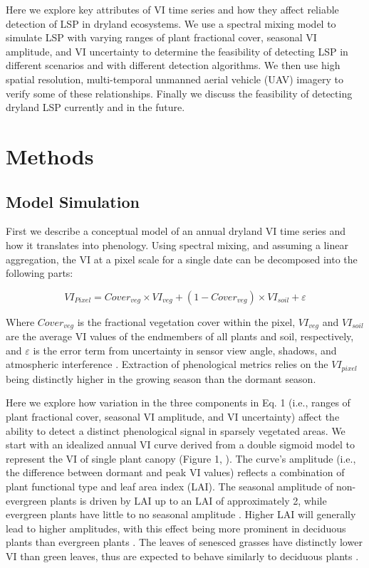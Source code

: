 \documentclass{article}
\begin{document}
Here we explore key attributes of VI time series and how they affect reliable detection of LSP in dryland ecosystems. We use a spectral mixing model to simulate LSP with varying ranges of plant fractional cover, seasonal VI amplitude, and VI uncertainty to determine the feasibility of detecting LSP in different scenarios and with different detection algorithms. We then use high spatial resolution, multi-temporal unmanned aerial vehicle (UAV) imagery to verify some of these relationships. Finally we discuss the feasibility of detecting dryland LSP currently and in the future. 

\section{Methods}

\subsection{Model Simulation}

First we describe a conceptual model of an annual dryland VI time series and how it translates into phenology. Using spectral mixing, and assuming a linear aggregation, the VI at a pixel scale for a single date can be decomposed into the following parts:

\begin{equation}
VI_{Pixel} = Cover_{veg}\times VI_{veg} + (1-Cover_{veg})\times VI_{soil} + \varepsilon 
\end{equation}

Where $Cover_{veg}$ is the fractional vegetation cover within the pixel, $VI_{veg}$ and $VI_{soil}$ are the average VI values of the endmembers of all plants and soil, respectively, and $\varepsilon$ is the error term from uncertainty in sensor view angle, shadows, and atmospheric interference \cite{huete1994, jiang2006}. Extraction of phenological metrics relies on the $VI_{pixel}$ being distinctly higher in the growing season than the dormant season.

Here we explore how variation in the three components in Eq. 1 (i.e., ranges of plant fractional cover, seasonal VI amplitude, and VI uncertainty) affect the ability to detect a distinct phenological signal in sparsely vegetated areas. We start with an idealized annual VI curve derived from a double sigmoid model to represent the VI of single plant canopy (Figure 1, \cite{elmore2012}). The curve’s amplitude (i.e., the difference between dormant and peak VI values) reflects a combination of plant functional type and leaf area index (LAI). The seasonal amplitude of non-evergreen plants is driven by LAI up to an LAI of approximately 2, while evergreen plants have little to no seasonal amplitude \cite{gamon1995, carlson1997}. Higher LAI will generally lead to higher amplitudes, with this effect being more prominent in deciduous plants than evergreen plants \cite{baghzouz2010, smith2019}. The leaves of senesced grasses have distinctly lower VI than green leaves, thus are expected to behave similarly to deciduous plants \cite{huete1987}.
\end{document}
